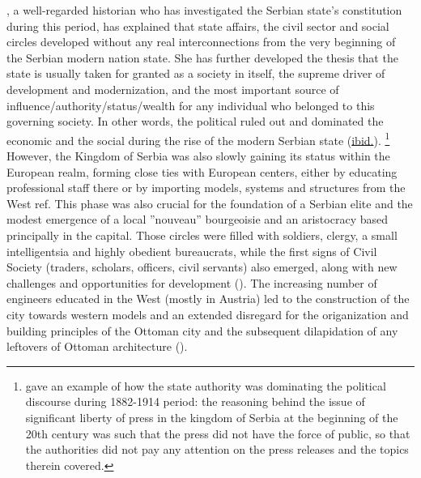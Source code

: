 \documentclass[11pt]{report}
\begin{document}
{{{{\href{Stojanovic}{\cite{stojanovic_ulje_2010}}, a well-regarded historian who has investigated the Serbian state’s constitution during this period, has explained that state affairs, the civil sector and social circles developed without any real interconnections from the very beginning of the Serbian modern nation state. She has further developed the thesis that the state is usually taken for granted as a society in itself, the supreme driver of development and modernization, and the most important source of influence/authority/status/wealth for any individual who belonged to this governing society. In other words, the political ruled out and dominated the economic and the social during the rise of the modern Serbian state  (\href{Stojanovic}{ibid.}).
\footnote{\href{Stojanovic}{\cite{stojanovic_ulje_2010}} gave an example of how the state authority was dominating the political discourse during 1882-1914 period: the reasoning behind the issue of significant liberty of press in the kingdom of Serbia at the beginning of the 20th century was such that the press did not have the force of public, so that the authorities did not pay any attention on the press releases and the topics therein covered.}
\\

However, the Kingdom of Serbia was also slowly gaining its status within the European realm, forming close ties with European centers, either by educating professional staff there or by importing models, systems and structures from the West ref. This phase was also crucial for 
the foundation of a Serbian elite and the modest emergence of a local ”nouveau” bourgeoisie and an aristocracy based principally in the capital. Those circles were filled with soldiers, clergy, a small intelligentsia and highly obedient bureaucrats, while the first signs of Civil Society (traders, scholars, officers, civil servants) also emerged, along with new challenges and opportunities for development (\href{Vukmirovic}{\citealt{vukmirovic_city_2013}}).
The increasing number of engineers educated in the West (mostly in Austria) led to the construction of the city towards western models and an extended disregard for the origanization and building principles of the Ottoman city and the subsequent dilapidation of any leftovers of Ottoman architecture (\href{Blagojevic}{\citealt{blagojevic_urban_2009}}).
\\

}}}}
\end{document}
